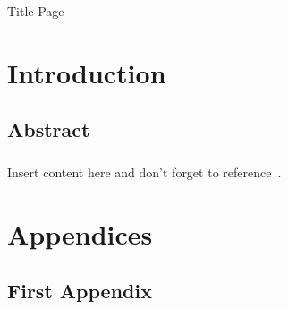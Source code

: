 \documentclass[a4paper, titlepage, numbers=noenddot]{scrreprt}
\begin{document}

\begin{titlepage}
  \centering
  {\huge Title Page}
\end{titlepage}

\tableofcontents{}


\chapter{Introduction}
\section{Abstract}
\paragraph{}
Insert content here and don't forget to reference~\cite{Sorace 2020}.

\printbibliography[title={References}]


\chapter*{Appendices}
\setcounter{section}{0}
\renewcommand{\thesection}{\Alph{section}}

\section{First Appendix}
\end{document}
